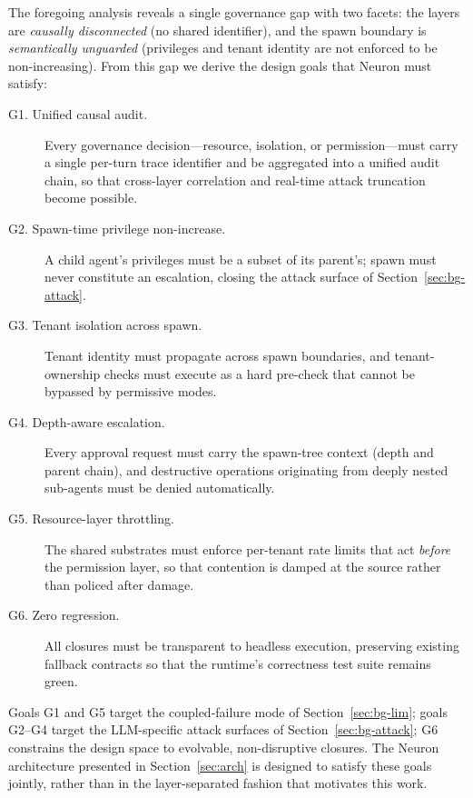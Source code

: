 The foregoing analysis reveals a single governance gap with two facets: the
layers are \emph{causally disconnected} (no shared identifier), and the spawn
boundary is \emph{semantically unguarded} (privileges and tenant identity are
not enforced to be non-increasing). From this gap we derive the design goals
that Neuron must satisfy:

\begin{description}
    \item[G1. Unified causal audit.] Every governance decision---resource,
    isolation, or permission---must carry a single per-turn trace identifier
    and be aggregated into a unified audit chain, so that cross-layer
    correlation and real-time attack truncation become possible.

    \item[G2. Spawn-time privilege non-increase.] A child agent's privileges
    must be a subset of its parent's; spawn must never constitute an
    escalation, closing the attack surface of Section~\ref{sec:bg-attack}.

    \item[G3. Tenant isolation across spawn.] Tenant identity must propagate
    across spawn boundaries, and tenant-ownership checks must execute as a
    hard pre-check that cannot be bypassed by permissive modes.

    \item[G4. Depth-aware escalation.] Every approval request must carry the
    spawn-tree context (depth and parent chain), and destructive operations
    originating from deeply nested sub-agents must be denied automatically.

    \item[G5. Resource-layer throttling.] The shared substrates must enforce
    per-tenant rate limits that act \emph{before} the permission layer, so
    that contention is damped at the source rather than policed after damage.

    \item[G6. Zero regression.] All closures must be transparent to headless
    execution, preserving existing fallback contracts so that the runtime's
    correctness test suite remains green.
\end{description}

Goals G1 and G5 target the coupled-failure mode of Section~\ref{sec:bg-lim};
goals G2--G4 target the LLM-specific attack surfaces of
Section~\ref{sec:bg-attack}; G6 constrains the design space to evolvable,
non-disruptive closures. The Neuron architecture presented in
Section~\ref{sec:arch} is designed to satisfy these goals jointly, rather than
in the layer-separated fashion that motivates this work.
